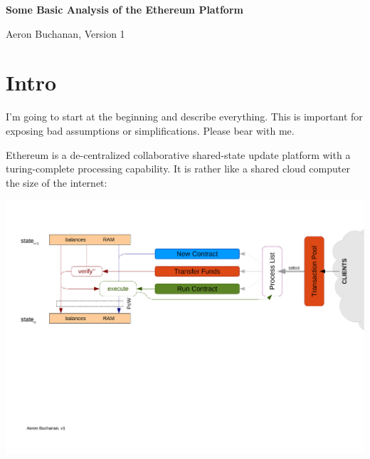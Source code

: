 \documentclass[10pt,a4paper]{article}
\begin{document}
\newcommand{\ether}{Ether\xspace}
\newcommand{\ie}{{i.e.}\xspace}
\newcommand{\eg}{{e.g.}\xspace}

\newcommand{\parameterize}[1]{{\ensuremath{#1}}\xspace}
\newcommand{\R}{\parameterize{R}}
\newcommand{\N}{\parameterize{N}}
\newcommand{\T}{\parameterize{T}}
\newcommand{\x}{\parameterize{\mathbf x}}
\newcommand{\udd}{\parameterize{\ddot{u}}}
\newcommand{\U}{\parameterize{\ddot{U}}}
\newcommand{\NC}{\parameterize{N^C}}

\renewcommand{\labelitemi}{$\cdot$}

\begin{center}
{\LARGE\bf Some Basic Analysis of the Ethereum Platform}

Aeron Buchanan, Version 1
\end{center} 

\vspace*{-.6cm}
\section*{Intro}

I'm going to start at the beginning and describe everything. This is important for exposing bad assumptions or simplifications. Please bear with me.

Ethereum is a de-centralized collaborative shared-state update platform with a turing-complete processing capability. It is rather like a shared cloud computer the size of the internet:

\begin{center}
\includegraphics[trim=0cm 10cm 0cm 2cm, clip, width=15cm]{Diagrams/FlowDiagramEthereumOnly.pdf}
\end{center}
\end{document}

